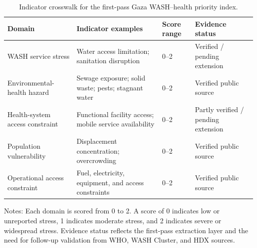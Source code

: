 \begin{table}[htbp]
\centering
\caption{Indicator crosswalk for the first-pass Gaza WASH--health priority index.}
\label{tab:indicator_crosswalk}
\begin{tabular}{llll}
\toprule
Domain & Indicator examples & Score range & Evidence status \\
\midrule
WASH service stress & Water access limitation; sanitation disruption & 0--2 & Verified / pending extension \\
Environmental-health hazard & Sewage exposure; solid waste; pests; stagnant water & 0--2 & Verified public source \\
Health-system access constraint & Functional facility access; mobile service availability & 0--2 & Partly verified / pending extension \\
Population vulnerability & Displacement concentration; overcrowding & 0--2 & Verified public source \\
Operational access constraint & Fuel, electricity, equipment, and access constraints & 0--2 & Verified public source \\
\bottomrule
\end{tabular}
\begin{flushleft}
\footnotesize Notes: Each domain is scored from 0 to 2. A score of 0 indicates low or unreported stress, 1 indicates moderate stress, and 2 indicates severe or widespread stress. Evidence status reflects the first-pass extraction layer and the need for follow-up validation from WHO, WASH Cluster, and HDX sources.
\end{flushleft}
\end{table}
